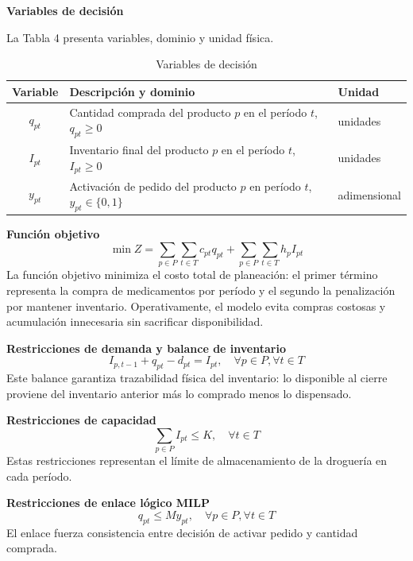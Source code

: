 \documentclass[12pt,letterpaper]{article}
\begin{document}
\textbf{Variables de decisión}

La Tabla 4 presenta variables, dominio y unidad física.
\begin{table}[H]
\centering
\caption{Variables de decisión}
\begin{tabular}{|c|p{7.8cm}|p{2.2cm}|}
\hline
\textbf{Variable} & \textbf{Descripción y dominio} & \textbf{Unidad} \\
\hline
$q_{pt}$ & Cantidad comprada del producto $p$ en el período $t$, $q_{pt}\ge 0$ & unidades \\
\hline
$I_{pt}$ & Inventario final del producto $p$ en el período $t$, $I_{pt}\ge 0$ & unidades \\
\hline
$y_{pt}$ & Activación de pedido del producto $p$ en período $t$, $y_{pt}\in\{0,1\}$ & adimensional \\
\hline
\end{tabular}
\end{table}

\textbf{Función objetivo}
\begin{equation}
\min Z=\sum_{p\in P}\sum_{t\in T}c_{pt}q_{pt}+\sum_{p\in P}\sum_{t\in T}h_pI_{pt}
\end{equation}
La función objetivo minimiza el costo total de planeación: el primer término representa la compra de medicamentos por período y el segundo la penalización por mantener inventario. Operativamente, el modelo evita compras costosas y acumulación innecesaria sin sacrificar disponibilidad.

\textbf{Restricciones de demanda y balance de inventario}
\begin{equation}
I_{p,t-1}+q_{pt}-d_{pt}=I_{pt},\quad \forall p\in P,\forall t\in T
\end{equation}
Este balance garantiza trazabilidad física del inventario: lo disponible al cierre proviene del inventario anterior más lo comprado menos lo dispensado.

\textbf{Restricciones de capacidad}
\begin{equation}
\sum_{p\in P}I_{pt}\le K,\quad \forall t\in T
\end{equation}
Estas restricciones representan el límite de almacenamiento de la droguería en cada período.

\textbf{Restricciones de enlace lógico MILP}
\begin{equation}
q_{pt}\le My_{pt},\quad \forall p\in P,\forall t\in T
\end{equation}
El enlace fuerza consistencia entre decisión de activar pedido y cantidad comprada.
\end{document}
